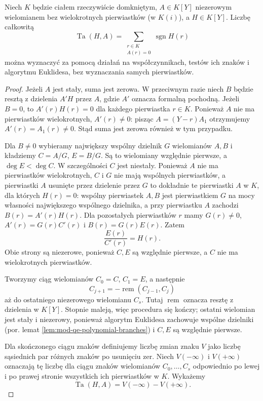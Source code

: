 \begin{lemat}
\label{lem:mod-qe-sturm-tarski}
Niech $K$ będzie ciałem rzeczywiście domkniętym,
$A\in K[Y]$ niezerowym wielomianem bez wielokrotnych
pierwiastków (w $K(i)$), a $H\in K[Y]$.
Liczbę całkowitą
\[
\operatorname{Ta}(H,A)=
\sum_{\substack{r\in K\\ A(r)=0}}\operatorname{sgn}H(r)
\]
można wyznaczyć za pomocą działań na współczynnikach,
testów ich znaków i algorytmu Euklidesa, bez wyznaczania
samych pierwiastków.
\end{lemat}
\begin{proof}
Jeżeli $A$ jest stały, suma jest zerowa. W przeciwnym
razie niech $B$ będzie resztą z dzielenia $A'H$ przez $A$,
gdzie $A'$ oznacza formalną pochodną. Jeżeli $B=0$,
to $A'(r)H(r)=0$ dla każdego pierwiastka $r\in K$.
Ponieważ $A$ nie ma pierwiastków wielokrotnych, $A'(r)\ne0$:
pisząc $A=(Y-r)A_1$ otrzymujemy $A'(r)=A_1(r)\ne0$.
Stąd suma jest zerowa również w tym przypadku.

Dla $B\ne0$ wybieramy największy wspólny dzielnik
$G$ wielomianów $A,B$ i kładziemy $C=A/G$, $E=B/G$.
Są to wielomiany względnie pierwsze, a $\deg E<\deg C$.
W szczególności $C$ jest niestały. Ponieważ $A$ nie ma pierwiastków wielokrotnych,
$C$ i $G$ nie mają wspólnych pierwiastków, a pierwiastki $A$
usunięte przez dzielenie przez $G$ to dokładnie te
pierwiastki $A$ w $K$, dla których $H(r)=0$:
wspólny pierwiastek $A,B$ jest pierwiastkiem $G$
na mocy własności największego wspólnego dzielnika,
a przy pierwiastku $A$ zachodzi $B(r)=A'(r)H(r)$.
Dla pozostałych pierwiastków $r$ mamy $G(r)\ne0$,
$A'(r)=G(r)C'(r)$ i $B(r)=G(r)E(r)$. Zatem
\[
\frac{E(r)}{C'(r)}=H(r).
\]
Obie strony są niezerowe, ponieważ $C,E$ są względnie
pierwsze, a $C$ nie ma wielokrotnych pierwiastków.

Tworzymy ciąg wielomianów
$C_0=C$, $C_1=E$, a następnie
\[
C_{j+1}=-\operatorname{rem}(C_{j-1},C_j)
\]
aż do ostatniego niezerowego wielomianu $C_s$.
Tutaj $\operatorname{rem}$ oznacza resztę z dzielenia
w $K[Y]$. Stopnie maleją, więc procedura się kończy;
ostatni wielomian jest stały i niezerowy, ponieważ
algorytm Euklidesa zachowuje wspólne dzielniki
(por. lemat \ref{lem:mod-qe-polynomial-branches})
i $C,E$ są względnie pierwsze.

Dla skończonego ciągu znaków definiujemy liczbę zmian
znaku $V$ jako liczbę sąsiednich par różnych znaków
po usunięciu zer. Niech $V(-\infty)$ i $V(+\infty)$
oznaczają tę liczbę dla ciągu znaków wielomianów
$C_0,\ldots,C_s$ odpowiednio po lewej i po prawej
stronie wszystkich ich pierwiastków w $K$.
Wykażemy
\[
\operatorname{Ta}(H,A)=V(-\infty)-V(+\infty).
\]


\end{proof}
